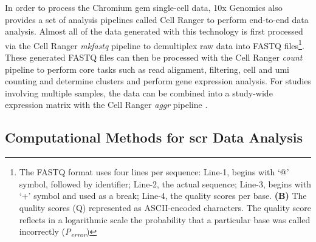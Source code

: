 \par In order to process the Chromium \gls{gem} single-cell data, 10x Genomics also provides a set of analysis pipelines called Cell Ranger to perform end-to-end data analysis. Almost all of the data generated with this technology is first processed via the Cell Ranger \textit{mkfastq} pipeline to demultiplex raw data into FASTQ files\footnote{ The FASTQ format uses four lines per sequence: Line-1, begins with `@' symbol, followed by identifier; Line-2, the actual sequence; Line-3, begins with `+' symbol and used as a break; Line-4, the quality scores per base. \textbf{(B)} The quality scores (Q) represented as ASCII-encoded characters. The quality score reflects in a logarithmic scale the probability that a particular base was called incorrectly (\textit{P\textsubscript{error}})}. These generated FASTQ files can then be processed with the Cell Ranger \textit{count} pipeline to perform core tasks such as read alignment, filtering, cell and \gls{umi} counting and determine clusters and perform gene expression analysis. For studies involving multiple samples, the data can be combined into a study-wide expression matrix with the Cell Ranger \textit{aggr} pipeline \textbf{\cite{noauthor_what_nodate}}. 


\clearpage


\subsection[Computational Methods for \glsentryshort{scr} Data Analysis]{Computational Methods for \gls{scr} Data Analysis}
\label{sec:scrna_analysis}

